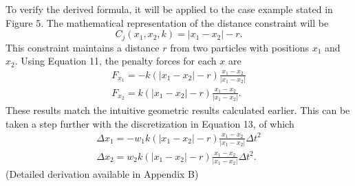 \documentclass[12pt, letterpaper]{article}
\begin{document}
To verify the derived formula, it will be applied to the case example stated in Figure 5. The mathematical representation of the distance constraint will be
\begin{equation}
    C_j(x_{1},x_{2}, k) = |x_{1}-x_{2}|-r.
\end{equation}
This constraint maintains a distance $r$ from two particles with positions $x_1$ and $x_2$.
Using Equation 11, the penalty forces for each $x$ are
\begin{equation}
    \begin{gathered}
        F_{x_{1}}=-k(|x_{1}-x_{2}|-r)\frac{x_{1}-x_{2}}{|x_{1}-x_{2}|}\\
        F_{x_{2}}= k(|x_{1}-x_{2}|-r)\frac{x_{1}-x_{2}}{|x_{1}-x_{2}|}.
    \end{gathered}
\end{equation}
These results match the intuitive geometric results calculated earlier. This can be taken a step further with the discretization in Equation 13, of which
\begin{equation}
    \begin{gathered}
        \Delta x_{1}=-w_{1}k(|x_{1}-x_{2}|-r)\frac{x_{1}-x_{2}}{|x_{1}-x_{2}|} \Delta t^{2}\\
        \Delta x_{2}=w_{2}k(|x_{1}-x_{2}|-r)\frac{x_{1}-x_{2}}{|x_{1}-x_{2}|} \Delta t^{2}.
    \end{gathered}
\end{equation}
(Detailed derivation available in Appendix B)
\end{document}
